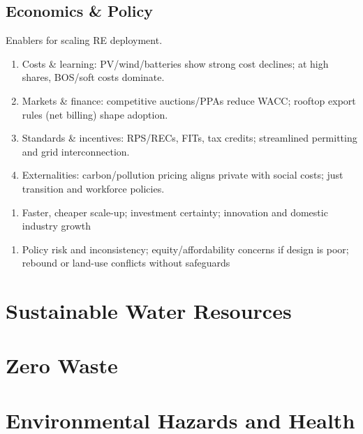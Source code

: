 \documentclass[12pt, a4paper]{article}
\begin{document}
\begin{multicols*}{3}
\subsection{Economics \& Policy}
Enablers for scaling RE deployment.
\begin{enumerate}[\roman*.]
  \item Costs \& learning: PV/wind/batteries show strong cost declines; at high shares, BOS/soft costs dominate.
  \item Markets \& finance: competitive auctions/PPAs reduce WACC; rooftop export rules (net billing) shape adoption.
  \item Standards \& incentives: RPS/RECs, FITs, tax credits; streamlined permitting and grid interconnection.
  \item Externalities: carbon/pollution pricing aligns private with social costs; just transition and workforce policies.
\end{enumerate}\vspace{-1pt}
\begin{enumerate}[$+$]
  \item Faster, cheaper scale-up; investment certainty; innovation and domestic industry growth
\end{enumerate}\vspace{-1pt}
\begin{enumerate}[$-$]
  \item Policy risk and inconsistency; equity/affordability concerns if design is poor; rebound or land-use conflicts without safeguards
\end{enumerate}

\colbreak
\section{Sustainable Water Resources}
\section{Zero Waste}
\section{Environmental Hazards and Health}

\end{multicols*}
\end{document}
